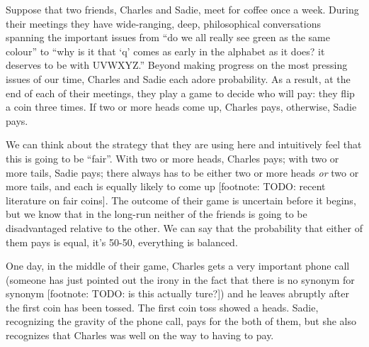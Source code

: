 \documentclass[
  letterpaper,
  DIV=11,
  numbers=noendperiod]{scrreprt}
\begin{document}
Suppose that two friends, Charles and Sadie, meet for coffee once a
week. During their meetings they have wide-ranging, deep, philosophical
conversations spanning the important issues from ``do we all really see
green as the same colour'' to ``why is it that `q' comes as early in the
alphabet as it does? it deserves to be with UVWXYZ.'' Beyond making
progress on the most pressing issues of our time, Charles and Sadie each
adore probability. As a result, at the end of each of their meetings,
they play a game to decide who will pay: they flip a coin three times.
If two or more heads come up, Charles pays, otherwise, Sadie pays.

We can think about the strategy that they are using here and intuitively
feel that this is going to be ``fair''. With two or more heads, Charles
pays; with two or more tails, Sadie pays; there always has to be either
two or more heads \emph{or} two or more tails, and each is equally
likely to come up {[}footnote: TODO: recent literature on fair coins{]}.
The outcome of their game is uncertain before it begins, but we know
that in the long-run neither of the friends is going to be disadvantaged
relative to the other. We can say that the probability that either of
them pays is equal, it's 50-50, everything is balanced.

One day, in the middle of their game, Charles gets a very important
phone call (someone has just pointed out the irony in the fact that
there is no synonym for synonym {[}footnote: TODO: is this actually
ture?{]}) and he leaves abruptly after the first coin has been tossed.
The first coin toss showed a heads. Sadie, recognizing the gravity of
the phone call, pays for the both of them, but she also recognizes that
Charles was well on the way to having to pay.
\end{document}
